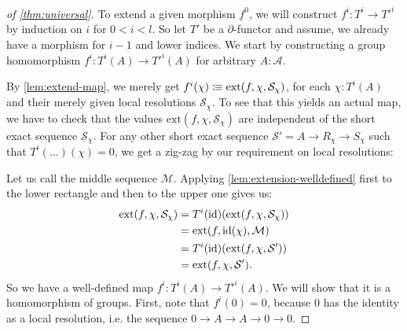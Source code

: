 \begin{proof}[of \cref{thm:universal}]
  To extend a given morphism $f^0$, 
  we will construct $f^i:T^i\to T'^i$ by induction on $i$ for $0<i<l$.
  So let $T'$ be a $\partial$-functor and assume, we already have a morphism for $i-1$ and lower indices.
  We start by constructing a group homomorphism $f^i:T^i(A)\to T'^i(A)$ for arbitrary $A:\mathcal A$.

  By \cref{lem:extend-map},
  we merely get $f^{i}(\chi)\vcentcolon\mspace{-1.2mu}\equiv \mathrm{ext}(f,\chi,\mathcal{S}_\chi)$,
  for each $\chi:T^i(A)$ and their merely given local resolutions $\mathcal{S}_\chi$.
  To see that this yields an actual map, we have to check that the
  values $\mathrm{ext}(f,\chi,\mathcal{S}_\chi)$ are independent of the short exact sequence $\mathcal{S}_\chi$.
  For any other short exact sequence $\mathcal{S}'=A\to R_\chi\to S_\chi$
  such that $T^i(\dots)(\chi)=0$, we get a zig-zag by our requirement on local resolutions:
  \begin{center}
  \end{center}
  Let us call the middle sequence $\mathcal{M}$.
  Applying \cref{lem:extension-welldefined} first to the lower rectangle and then to the upper one gives us:
  \begin{align*}
    \mathrm{ext}(f,\chi,\mathcal{S}_\chi) &= T^i(\id)(\mathrm{ext}(f,\chi,\mathcal{S}_\chi)) \\
                                          &=\mathrm{ext}(f,\id(\chi),\mathcal{M}) \\
                                          &=T^i(\id)(\mathrm{ext}(f,\chi,\mathcal{S}')) \\
                                          &=\mathrm{ext}(f,\chi,\mathcal{S}')
                                            \rlap{.}
  \end{align*}
  So we have a well-defined map $f^{i}:T^i(A)\to T'^i(A)$.
  We will show that it is a homomorphism of groups.
  First, note that $f^i(0)=0$,
  because $0$ has the identity as a local resolution, i.e. the sequence $0\to A\to A\to 0\to 0$.
  

\end{proof}
